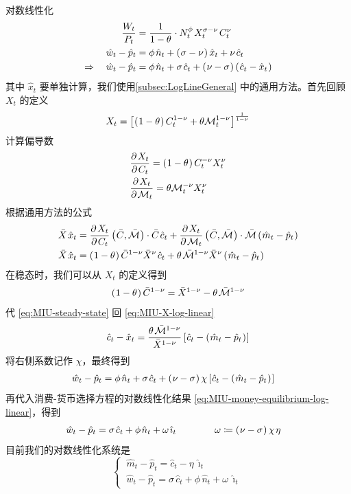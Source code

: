 \myskip
{}

对数线性化
\begin{align*}
    \dfrac{W_t}{P_t}&=\dfrac1{1-\theta}\cdot N_t^\phi\,X_t^{\sigma-\nu}\,C_t^\nu\\
    \hat w_t-\hat p_t&=\phi\,\hat n_t+\bka{\sigma-\nu}\hat x_t+\nu\,\hat c_t\\
    \Rightarrow\quad \hat w_t-\hat p_t&=\phi\,\hat n_t+\sigma\,\hat c_t+\bka{\nu-\sigma}\bka{\hat c_t-\hat x_t}
\end{align*}
其中 \(\hat x_t\) 要单独计算，我们使用\ref{subsec:LogLineGeneral} 中的通用方法。首先回顾 \(X_t\) 的定义
\begin{align}
    X_t=\bks{\bka{1-\theta}C_t^{1-\nu}+\theta\cal M_t^{1-\nu}}^{\frac{1}{1-\nu}}\label{eq:MIU-X}
\end{align}
计算偏导数
\begin{align*}
    &\dfrac{\p X_t}{\p C_t}=\bka{1-\theta}C_t^{-\nu}X_t^\nu\\
    &\dfrac{\p X_t}{\p \cal M_t}=\theta\cal M_t^{-\nu}X_t^\nu
\end{align*}
根据通用方法的公式
\begin{align}
    \bar X\,\hat x_t&=\dfrac{\p X_t}{\p C_t}\bka{\bar C,\bar{\cal M}}\cdot \bar C\,\hat c_t+\dfrac{\p X_t}{\p \cal M_t}\bka{\bar C,\bar{\cal M}}\cdot \bar{\cal M}\bka{\hat m_t-\hat p_t}\notag\\
    \bar X\,\hat x_t&=\bka{1-\theta}\bar C^{1-\nu}\bar X^\nu\,\hat c_t+\theta\,\bar{\cal M}^{1-\nu}\bar X^\nu\bka{\hat m_t-\hat p_t}\label{eq:MIU-X-log-linear}
\end{align}
在稳态时，我们可以从 \(X_t\) 的定义得到
\begin{align}
    \bka{1-\theta}\bar C^{1-\nu}=\bar X^{1-\nu}-\theta\,\bar{\cal M}^{1-\nu}\label{eq:MIU-steady-state}
\end{align}
代 \ref{eq:MIU-steady-state} 回 \ref{eq:MIU-X-log-linear}
\begin{align*}
    \hat c_t-\hat x_t=\dfrac{\theta\,\bar{\cal M}^{1-\nu}}{\bar X^{1-\nu}}\bks{\hat c_t-\bka{\hat m_t-\hat p_t}}
\end{align*}
将右侧系数记作 \(\chi\)，最终得到
\begin{align*}
    \hat w_t-\hat p_t&=\phi\,\hat n_t+\sigma\,\hat c_t+\bka{\nu-\sigma}\chi\bks{\hat c_t-\bka{\hat m_t-\hat p_t}}
\end{align*}
再代入消费-货币选择方程的对数线性化结果 \ref{eq:MIU-money-equilibrium-log-linear}，得到
\begin{align}
    \hat w_t-\hat p_t&=\sigma\,\hat c_t+\phi\,\hat n_t+\omega\,\hat\imath_t\qquad\qquad\omega\coloneq\bka{\nu-\sigma}\chi\,\eta\label{eq:MIU-labor-equilibrium-log-linear}
\end{align}
目前我们的对数线性化系统是
\begin{equation*}
    \begin{cases}
        \ \hat m_t-\hat p_t=\hat c_t-\eta\,\hat\imath_t\\
        \ \hat w_t-\hat p_t=\sigma\,\hat c_t+\phi\,\hat n_t+\omega\,\hat\imath_t
    \end{cases}
\end{equation*}

